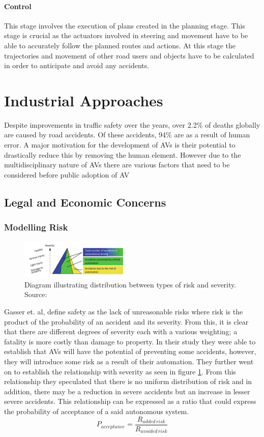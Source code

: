 \paragraph{Control}This stage involves the execution of plans created in the planning stage. This stage is crucial as the actuators involved in steering and movement have to be able to accurately follow the planned routes and actions. At this stage the trajectories and movement of other road users and objects have to be calculated in order to anticipate and avoid any accidents. 
	

\section{Industrial Approaches}
Despite improvements in traffic safety over the years, over  2.2$\%$ of deaths globally are caused by road accidents. Of these accidents, 94$\%$ are as a result of human error. A major motivation for the development of AVs is their potential to drastically reduce this by removing the human element. However due to the multidisciplinary nature of AVs there are various factors that need to be considered before public adoption of AV


\subsection{Legal and Economic Concerns}
\subsubsection*{Modelling Risk}
\begin{figure}
	\centering
	\includegraphics[width=0.48\textwidth]{images/risk}
	\caption{Diagram illustrating distribution between types of risk and severity. Source:\cite{gasser2016fundamental}}
	\label{fig:riskrel}
\end{figure}
Gasser et. al\cite{gasser2016fundamental}, define safety as the lack of unreasonable risks where risk is the product of the probability of an accident and its severity. From this, it is clear that there are different degrees of severity each with a various weighting; a fatality is more costly than damage to property. In their study they were able to establish that AVs will have the potential of preventing some accidents, however, they will introduce some risk as a result of their automation. They further went on to establish the relationship with severity as seen in figure \ref{fig:riskrel}. From this relationship they speculated that there is no uniform distribution of risk and in addition, there may be a reduction in severe accidents but an increase in lesser severe accidents. 
This relationship can be expressed as a ratio that could express the probability of  acceptance of a said autonomous system. 
\begin{equation*}
P_{acceptance} = \frac{R_{added\, risk}}{R_{avoided\, risk}}
\end{equation*}

